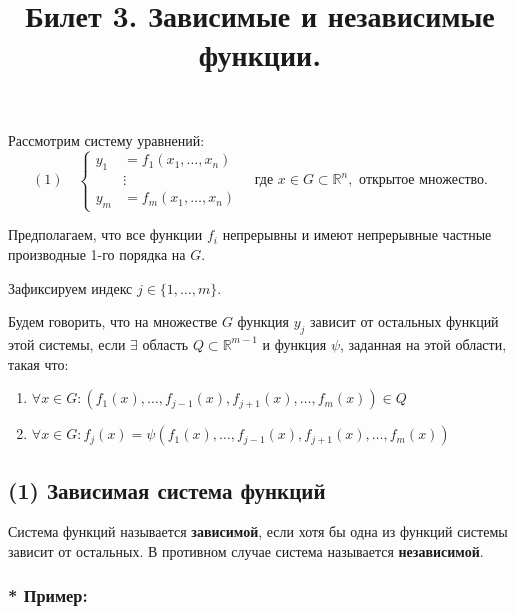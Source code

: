 \documentclass{article}
\title{ Билет 3. Зависимые и независимые функции.}
\author{}
\date{}
\begin{document}
\maketitle

Рассмотрим систему уравнений:
\begin{equation}
(1) \quad
\left\{
\begin{aligned}
y_1 &= f_1(x_1, \dots, x_n) \\
&\vdots \\
y_m &= f_m(x_1, \dots, x_n)
\end{aligned}
\right.
\quad
\text{где } x \in G \subset \mathbb{R}^n, \text{ открытое множество}.
\end{equation}

Предполагаем, что все функции $f_i$ непрерывны и имеют непрерывные частные производные 1-го порядка на $G$.

Зафиксируем индекс $j \in \{1, \dots, m\}$.

Будем говорить, что на множестве $G$ функция $y_j$ зависит от остальных функций этой системы, если $\exists$ область $Q \subset \mathbb{R}^{m-1}$ и функция $\psi$, заданная на этой области, такая что:
\begin{enumerate}
    \item $\forall x \in G: \left(f_1(x), \dots, f_{j-1}(x), f_{j+1}(x), \dots, f_m(x)\right) \in Q$
    \item $\forall x \in G: f_j(x) = \psi\left(f_1(x), \dots, f_{j-1}(x), f_{j+1}(x), \dots, f_m(x)\right)$
\end{enumerate}

\subsection*{(1) Зависимая система функций}

Система функций называется \textbf{зависимой}, если хотя бы одна из функций системы зависит от остальных. В противном случае система называется \textbf{независимой}.

\subsubsection*{* Пример:}
\end{document}
